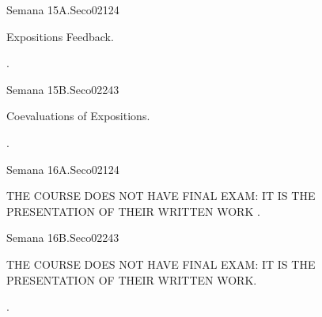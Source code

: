 \begin{syllabus}
\begin{unit}{}{Semana 15A.}{Seco02}{12}{4}
   \begin{topics}
      \item Expositions Feedback.
   \end{topics}
   \begin{learningoutcomes}
      \item .
   \end{learningoutcomes}
\end{unit}

\begin{unit}{}{Semana 15B.}{Seco02}{24}{3}
   \begin{topics}
      \item Coevaluations of  Expositions.
   \end{topics}

   \begin{learningoutcomes}
      \item .
      \end{learningoutcomes}
\end{unit}

\begin{unit}{}{Semana 16A.}{Seco02}{12}{4}
   \begin{topics}
      \item THE COURSE DOES NOT HAVE FINAL EXAM: IT IS THE PRESENTATION OF THEIR  WRITTEN WORK .
   \end{topics}
   \begin{learningoutcomes}
      \item 
   \end{learningoutcomes}
\end{unit}

\begin{unit}{}{Semana 16B.}{Seco02}{24}{3}
   \begin{topics}
      \item THE COURSE DOES NOT HAVE FINAL EXAM: IT IS THE PRESENTATION OF THEIR  WRITTEN WORK.
   \end{topics}

   \begin{learningoutcomes}
      \item .
      \end{learningoutcomes}
\end{unit}


\begin{coursebibliography}
\end{coursebibliography}

\end{syllabus}
